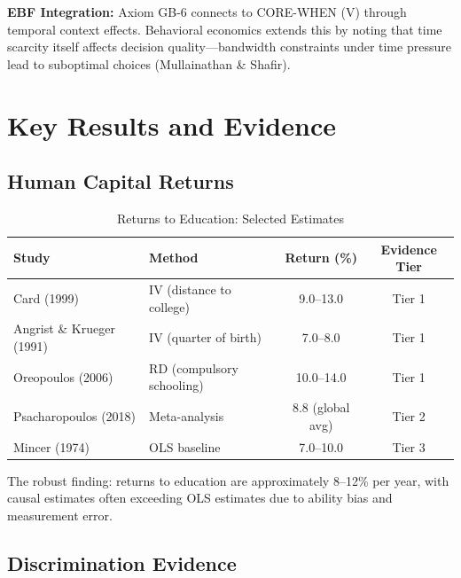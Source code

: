 \textbf{EBF Integration:} Axiom GB-6 connects to CORE-WHEN (V) through temporal context effects. Behavioral economics extends this by noting that time scarcity itself affects decision quality---bandwidth constraints under time pressure lead to suboptimal choices (Mullainathan \& Shafir).

\section{Key Results and Evidence}
\label{sec:gb-results}

\subsection{Human Capital Returns}

\begin{table}[htbp]
\centering
\caption{Returns to Education: Selected Estimates}
\label{tab:gb-returns}
\begin{tabular}{llcc}
\toprule
\textbf{Study} & \textbf{Method} & \textbf{Return (\%)} & \textbf{Evidence Tier} \\
\midrule
Card (1999) & IV (distance to college) & 9.0--13.0 & Tier 1 \\
Angrist \& Krueger (1991) & IV (quarter of birth) & 7.0--8.0 & Tier 1 \\
Oreopoulos (2006) & RD (compulsory schooling) & 10.0--14.0 & Tier 1 \\
Psacharopoulos (2018) & Meta-analysis & 8.8 (global avg) & Tier 2 \\
Mincer (1974) & OLS baseline & 7.0--10.0 & Tier 3 \\
\bottomrule
\end{tabular}
\end{table}

The robust finding: returns to education are approximately 8--12\% per year, with causal estimates often exceeding OLS estimates due to ability bias and measurement error.

\subsection{Discrimination Evidence}

